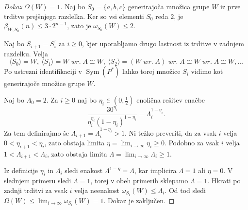 \documentclass[11pt]{book}
\renewcommand{\wreath}{\; wr. \;}
\DeclareMathOperator\Sym{Sym}
\theoremstyle{definition}
\theoremstyle{zgled}
\theoremstyle{odprtproblem}
\theoremstyle{domacanaloga}
\newenvironment{dokaz}
    {\color{siva}\begin{proof}}
    {\end{proof}}
\theoremstyle{izrek}
\begin{document}
\begin{dokaz}[Dokaz $\Omega(W) = 1$]
Naj bo $S_0 = \{ a, b, c \}$ generirajoča množica grupe $W$ iz prve trditve prejšnjega razdelka. Ker so vsi elementi $S_0$ reda $2$, je $\beta_{W,S_0}(n) \leq 3 \cdot 2^{n-1}$, zato je $\omega_{S_0}(W) \leq 2$.

Naj bo $S_{i+1} = S_i^\prime$ za $i \geq 0$, kjer uporabljamo drugo lastnost iz trditve v zadnjem razdelku. Velja
\[
\langle S_0 \rangle = W, \ \langle S_1 \rangle = W \wreath A \cong W, \ \langle S_2 \rangle = (W \wreath A) \wreath A \cong W \wreath A \cong W, \dots
\]
Po ustrezni identifikaciji v $\Sym(P^*)$ lahko torej množice $S_i$ vidimo kot generirajoče množice grupe $W$.

Naj bo $\Lambda_0 = 2$. Za $i \geq 0$ naj bo $\eta_i \in (0, \frac12)$ enolična rešitev enačbe
\[
\frac{30^{\eta_i}}{\eta_i^{\eta_i} (1 - \eta_i)^{1 - \eta_i}} = \Lambda_i^{1 - \eta_i}.
\]
Za tem definirajmo še $\Lambda_{i+1} = \Lambda_i^{1 - \eta_i} > 1$. Ni težko preveriti, da za vsak $i$ velja $0 < \eta_{i+1} < \eta_i$, zato obstaja limita $\eta = \lim_{i \to \infty} \eta_i \geq 0$. Podobno za vsak $i$ velja $1 < \Lambda_{i+1} < \Lambda_i$, zato obstaja limita $\Lambda = \lim_{i \to \infty} \Lambda_i \geq 1$. 

Iz definicije $\eta_i$ in $\Lambda_i$ sledi enakost $\Lambda^{1-\eta} = \Lambda$, kar implicira $\Lambda = 1$ ali $\eta = 0$. V slednjem primeru sledi $\Lambda = 1$, torej v obeh primerih sklepamo $\Lambda = 1$. Hkrati po zadnji trditvi za vsak $i$ velja neenakost $\omega_{S_i}(W) \leq \Lambda_i$. Od tod sledi $\Omega(W) \leq \lim_{i \to \infty} \omega_{S_i}(W) = 1$. Dokaz je zaključen.
\end{dokaz}
\end{document}
